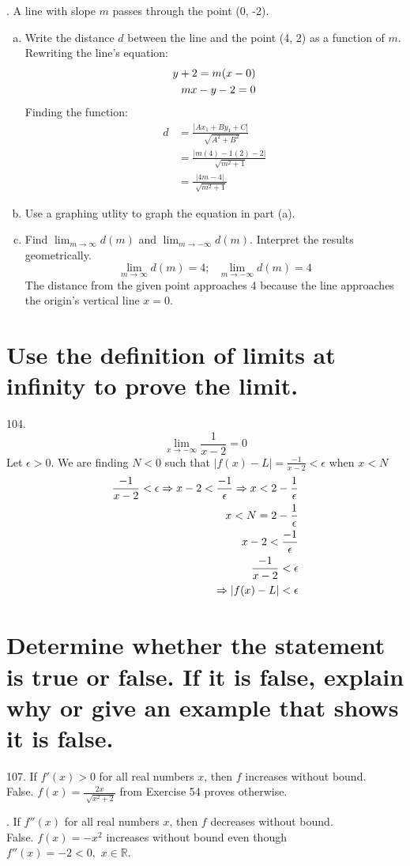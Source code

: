 \documentclass[11pt]{article}
\newcommand*{\vs}{\vspace{1cm}}
\newcommand*{\next}{\noindent}
\newcommand*{\set}{\setcounter{equation}{0}}
\begin{document}
 \vs\next
 96. A line with slope $m$ passes through the point (0, -2).
 \begin{enumerate}[(a)]
    \item Write the distance $d$ between the line and the point (4, 2) as a function of $m$.\\
    Rewriting the line's equation:
    \begin{align}
        \set
        y+2=m(x-0)\\
        mx-y-2=0
    \end{align}
    Finding the function:
    \begin{align}
        d&=\frac{|Ax_1+By_1+C|}{\sqrt[]{A^2+B^2}}\\
        &=\frac{|m(4)-1(2)-2|}{\sqrt[]{m^2+1}}\\
        &=\frac{|4m-4|}{\sqrt[]{m^2+1}}
    \end{align}
    \item Use a graphing utlity to graph the equation in part (a).
    \item Find $\lim_{m\to\infty}d(m)$ and $\lim_{m\to-\infty}d(m)$. Interpret the results geometrically.
    \[\lim_{m\to\infty}d(m)=4;\,\,\,\,\lim_{m\to-\infty}d(m)=4\]
The distance from the given point approaches 4 because the line approaches the origin's vertical line $x=0$.
\end{enumerate}

\section{Use the definition of limits at infinity to prove the limit.}
104.\[\lim_{x\to-\infty}\frac{1}{x-2}=0\]
Let $\epsilon>0$. We are finding $N<0$ such that $|f(x)-L|=\frac{-1}{x-2}<\epsilon$ when $x<N$
\begin{align}
    \set
    \frac{-1}{x-2}<\epsilon\Rightarrow x-2<\frac{-1}{\epsilon}\Rightarrow x<2-\frac{1}{\epsilon}\\
    x<N=2-\frac{1}{\epsilon}\\
    x-2<\frac{-1}{\epsilon}\\
    \frac{-1}{x-2}<\epsilon\\
    \Rightarrow|f(x)-L|<\epsilon
\end{align}

\section{Determine whether the statement is true or false. If it is false, explain why or give an example that shows it is false.}
107. If $f'(x)>0$ for all real numbers $x$, then $f$ increases without bound.\\
\indent False. $f(x)=\frac{2x}{\sqrt[]{x^2+2}}$ from Exercise 54 proves otherwise.

\vs\next
108. If $f''(x)$ for all real numbers $x$, then $f$ decreases without bound.\\
\indent False. $f(x)=-x^2$ increases without bound even though $f''(x)=-2<0,\,\, x\in\mathbb{R}$.
\end{document}
